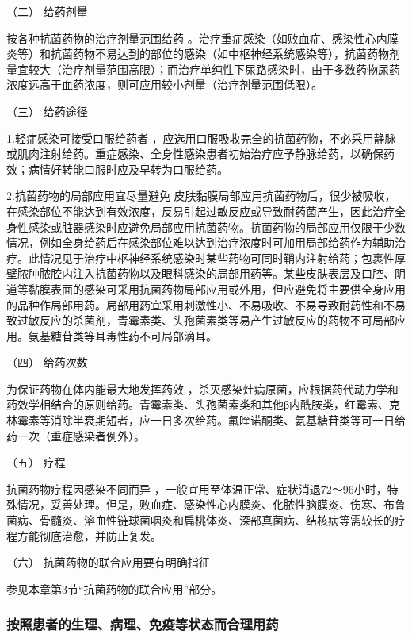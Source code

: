 \hypertarget{text00430.htmlux5cux23CHP17-7-1-4-2}{}
（二） 给药剂量

按各种抗菌药物的治疗剂量范围给药
。治疗重症感染（如败血症、感染性心内膜炎等）和抗菌药物不易达到的部位的感染（如中枢神经系统感染等），抗菌药物剂量宜较大（治疗剂量范围高限）；而治疗单纯性下尿路感染时，由于多数药物尿药浓度远高于血药浓度，则可应用较小剂量（治疗剂量范围低限）。

\hypertarget{text00430.htmlux5cux23CHP17-7-1-4-3}{}
（三） 给药途径

1.轻症感染可接受口服给药者
，应选用口服吸收完全的抗菌药物，不必采用静脉或肌肉注射给药。重症感染、全身性感染患者初始治疗应予静脉给药，以确保药效；病情好转能口服时应及早转为口服给药。

2.抗菌药物的局部应用宜尽量避免
皮肤黏膜局部应用抗菌药物后，很少被吸收，在感染部位不能达到有效浓度，反易引起过敏反应或导致耐药菌产生，因此治疗全身性感染或脏器感染时应避免局部应用抗菌药物。抗菌药物的局部应用仅限于少数情况，例如全身给药后在感染部位难以达到治疗浓度时可加用局部给药作为辅助治疗。此情况见于治疗中枢神经系统感染时某些药物可同时鞘内注射给药；包裹性厚壁脓肿脓腔内注入抗菌药物以及眼科感染的局部用药等。某些皮肤表层及口腔、阴道等黏膜表面的感染可采用抗菌药物局部应用或外用，但应避免将主要供全身应用的品种作局部用药。局部用药宜采用刺激性小、不易吸收、不易导致耐药性和不易致过敏反应的杀菌剂，青霉素类、头孢菌素类等易产生过敏反应的药物不可局部应用。氨基糖苷类等耳毒性药不可局部滴耳。

\hypertarget{text00430.htmlux5cux23CHP17-7-1-4-4}{}
（四） 给药次数

为保证药物在体内能最大地发挥药效
，杀灭感染灶病原菌，应根据药代动力学和药效学相结合的原则给药。青霉素类、头孢菌素类和其他β内酰胺类，红霉素、克林霉素等消除半衰期短者，应一日多次给药。氟喹诺酮类、氨基糖苷类等可一日给药一次（重症感染者例外）。

\hypertarget{text00430.htmlux5cux23CHP17-7-1-4-5}{}
（五） 疗程

抗菌药物疗程因感染不同而异
，一般宜用至体温正常、症状消退72～96小时，特殊情况，妥善处理。但是，败血症、感染性心内膜炎、化脓性脑膜炎、伤寒、布鲁菌病、骨髓炎、溶血性链球菌咽炎和扁桃体炎、深部真菌病、结核病等需较长的疗程方能彻底治愈，并防止复发。

\hypertarget{text00430.htmlux5cux23CHP17-7-1-4-6}{}
（六） 抗菌药物的联合应用要有明确指征

参见本章第3节“抗菌药物的联合应用”部分。

\subsubsection{按照患者的生理、病理、免疫等状态而合理用药}

